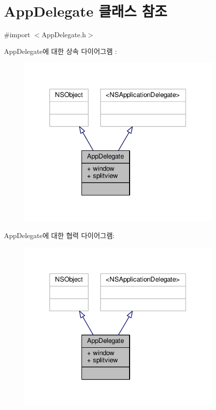 \hypertarget{interface_app_delegate}{}\section{App\+Delegate 클래스 참조}
\label{interface_app_delegate}


{\ttfamily \#import $<$App\+Delegate.\+h$>$}



App\+Delegate에 대한 상속 다이어그램 \+: 
\nopagebreak
\begin{figure}[H]
\begin{center}
\leavevmode
\includegraphics[width=288pt]{interface_app_delegate__inherit__graph}
\end{center}
\end{figure}


App\+Delegate에 대한 협력 다이어그램\+:
\nopagebreak
\begin{figure}[H]
\begin{center}
\leavevmode
\includegraphics[width=288pt]{interface_app_delegate__coll__graph}
\end{center}
\end{figure}
